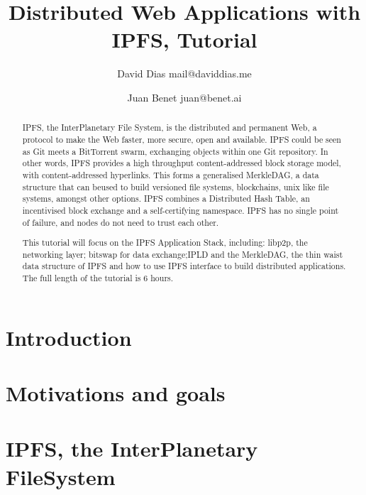 \documentclass[runningheads,a4paper]{llncs}
\begin{document}
\title{Distributed Web Applications with IPFS, Tutorial}
\author{David Dias mail@daviddias.me \and Juan Benet juan@benet.ai}

\maketitle


\begin{abstract}
IPFS, the InterPlanetary File System, is the distributed and permanent Web, a protocol to make the Web faster, more secure, open and available. IPFS could be seen as Git meets a BitTorrent swarm, exchanging objects within one Git repository. In other words, IPFS provides a high throughput content-addressed block storage model, with content-addressed hyperlinks. This forms a generalised MerkleDAG, a data structure that can beused to build versioned file systems, blockchains, unix like file systems, amongst other options. IPFS combines a Distributed Hash Table, an incentivised block exchange and a self-certifying namespace. IPFS has no single point of failure, and nodes do not need to trust each other.

This tutorial will focus on the IPFS Application Stack, including: libp2p, the networking layer; bitswap for data exchange;IPLD and the MerkleDAG, the thin waist data structure of IPFS and how to use IPFS interface to build distributed applications. The full length of the tutorial is 6 hours.
\end{abstract}




\section{Introduction}\label{sec:intro}

\section{Motivations and goals}\label{sec:motivation}

\section{IPFS, the InterPlanetary FileSystem}\label{sec:ipfs}
\end{document}

